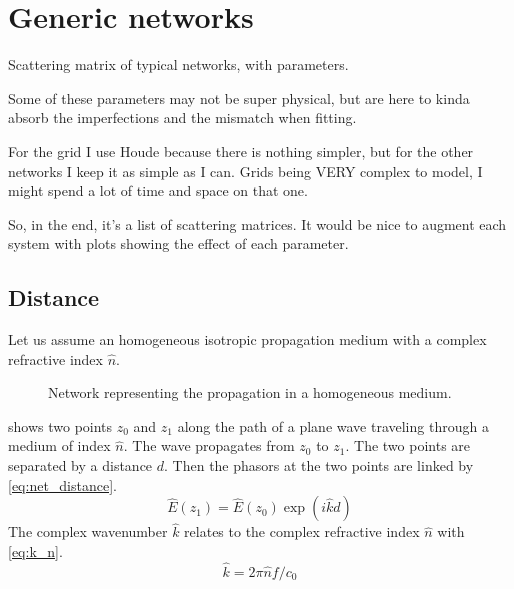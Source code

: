 \section{Generic networks}
\label{sec:chapter2_4}
\label{sec:generic_networks}

Scattering matrix of typical networks, with parameters.

Some of these parameters may not be super physical, but are here to kinda absorb the imperfections and the mismatch when fitting.

For the grid I use Houde \cite{houde_2001} because there is nothing simpler, but for the other networks I keep it as simple as I can.
Grids being VERY complex to model, I might spend a lot of time and space on that one.

So, in the end, it's a list of scattering matrices.  It would be nice to augment each system with plots showing the effect of each parameter.




\subsection{Distance}
\label{sec:generic_networks_distance}
Let us assume an homogeneous isotropic propagation medium with a complex refractive index $\hat{n}$.

\begin{figure}[hbtp]
    \centering
    
    \caption{Network representing the propagation in a homogeneous medium.}
    \label{fig:net_distance}
\end{figure}
 shows two points $z_0$ and $z_1$ along the path of a plane wave traveling through a medium of index $\hat{n}$.
The wave propagates from $z_0$ to $z_1$.
The two points are separated by a distance $d$.
Then the phasors at the two points are linked by \cref{eq:net_distance}.
\begin{equation}
    \hat{E}(z_1) = \hat{E}(z_0) \exp(i\hat{k}d)
    \label{eq:net_distance}
\end{equation}
The complex wavenumber $\hat{k}$ relates to the complex refractive index $\hat{n}$ with \cref{eq:k_n}.
\begin{equation}
    \hat{k} = 2\pi \hat{n} f / c_0 \label{eq:k_n}
\end{equation}

